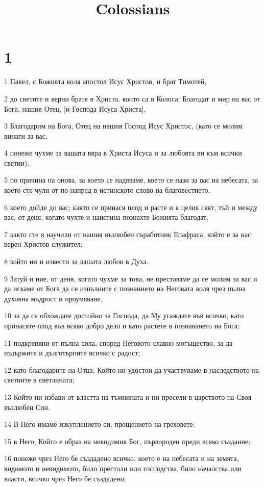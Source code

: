 

\title{Colossians}


\chapter{1}

\par 1 Павел, с Божията воля апостол Исус Христов, и брат Тимотей,
\par 2 до светите и верни братя в Христа, които са в Колоса: Благодат и мир на вас от Бога, нашия Отец, [и Господа Исуса Христа],
\par 3 Благодарим на Бога, Отец на нашия Господ Исус Христос, (като се молим винаги за вас,
\par 4 понеже чухме за вашата вяра в Христа Исуса и за любовта ви към всички светии),
\par 5 по причина на онова, за което се надяваме, което се пази за вас на небесата, за което сте чули от по-напред в истинското слово на благовестието,
\par 6 което дойде до вас; както се принася плод и расте и в целия свят, тъй и между вас, от деня, когато чухте и наистина познахте Божията благодат,
\par 7 както сте я научили от нашия възлюбен съработник Епафраса, който е за нас верен Христов служител;
\par 8 който ни и извести за вашата любов в Духа.
\par 9 Затуй и ние, от деня, когато чухме за това, не преставаме да се молим за вас и да искаме от Бога да се изпълните с познанието на Неговата воля чрез пълна духовна мъдрост и проумяване,
\par 10 за да се обхождате достойно за Господа, да Му угаждате във всичко, като принасяте плод във всяко добро дело и като растете в познаването на Бога;
\par 11 подкрепяни от пълна сила, според Неговото славно могъщество, за да издържите и дълготърпите всичко с радост;
\par 12 като благодарите на Отца, Който ни удостои да участвуваме в наследството на светиите в светлината;
\par 13 Който ни избави от властта на тъмнината и ни пресели в царството на Своя възлюбен Син.
\par 14 В Него имаме изкуплението си, прощението на греховете;
\par 15 в Него, Който е образ на невидимия Бог, първороден преди всяко създание;
\par 16 понеже чрез Него бе създадено всичко, което е на небесата и на земята, видимото и невидимото, било престоли или господства, било началства или власти, всичко чрез Него бе създадено;
